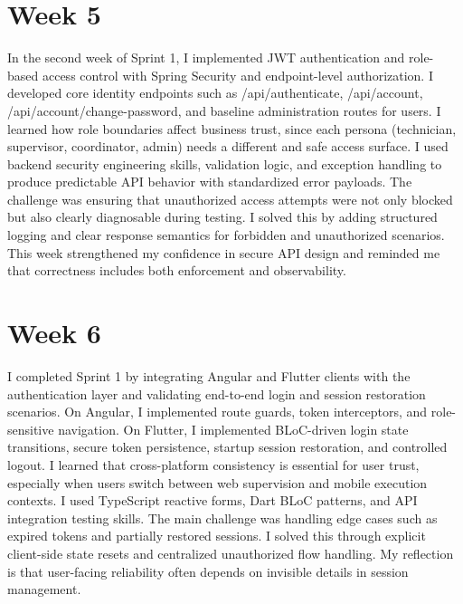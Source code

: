 \section*{Week 5}
In the second week of Sprint 1, I implemented JWT authentication and role-based access control with Spring Security and endpoint-level authorization. I developed core identity endpoints such as /api/authenticate, /api/account, /api/account/change-password, and baseline administration routes for users. I learned how role boundaries affect business trust, since each persona (technician, supervisor, coordinator, admin) needs a different and safe access surface. I used backend security engineering skills, validation logic, and exception handling to produce predictable API behavior with standardized error payloads. The challenge was ensuring that unauthorized access attempts were not only blocked but also clearly diagnosable during testing. I solved this by adding structured logging and clear response semantics for forbidden and unauthorized scenarios. This week strengthened my confidence in secure API design and reminded me that correctness includes both enforcement and observability.

\section*{Week 6}
I completed Sprint 1 by integrating Angular and Flutter clients with the authentication layer and validating end-to-end login and session restoration scenarios. On Angular, I implemented route guards, token interceptors, and role-sensitive navigation. On Flutter, I implemented BLoC-driven login state transitions, secure token persistence, startup session restoration, and controlled logout. I learned that cross-platform consistency is essential for user trust, especially when users switch between web supervision and mobile execution contexts. I used TypeScript reactive forms, Dart BLoC patterns, and API integration testing skills. The main challenge was handling edge cases such as expired tokens and partially restored sessions. I solved this through explicit client-side state resets and centralized unauthorized flow handling. My reflection is that user-facing reliability often depends on invisible details in session management.

